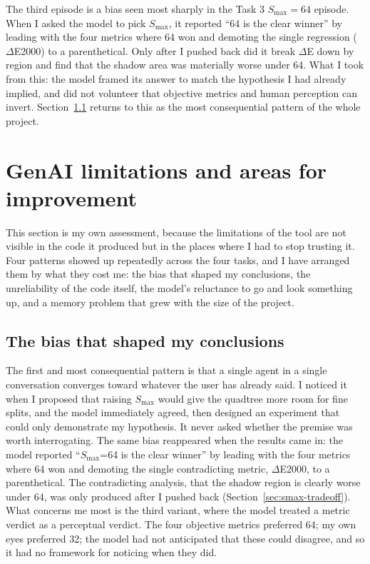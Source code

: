 \documentclass[11pt,a4paper]{article}
\begin{document}
The third episode is a bias seen most sharply in the Task 3 $S_{\max}=64$
episode. When I asked the model to pick $S_{\max}$, it reported ``64 is the clear
winner'' by leading with the four metrics where 64 won and demoting the single
regression ($\Delta$E2000) to a parenthetical. Only after I pushed back did it
break $\Delta$E down by region and find that the shadow area was materially worse
under 64. What I took from this: the model framed its answer to match the
hypothesis I had already implied, and did not volunteer that objective metrics
and human perception can invert. Section~\ref{sec:ai-bias} returns to this as the
most consequential pattern of the whole project.

\FloatBarrier
\FloatBarrier
\section{GenAI limitations and areas for improvement}
\label{sec:ai-limitations}

This section is my own assessment, because the limitations of the tool are not
visible in the code it produced but in the places where I had to stop trusting
it. Four patterns showed up repeatedly across the four tasks, and I have
arranged them by what they cost me: the bias that shaped my conclusions, the
unreliability of the code itself, the model's reluctance to go and look something
up, and a memory problem that grew with the size of the project.

\FloatBarrier
\FloatBarrier
\subsection{The bias that shaped my conclusions}
\label{sec:ai-bias}

The first and most consequential pattern is that a single agent in a single
conversation converges toward whatever the user has already said. I noticed it
when I proposed that raising $S_{\max}$ would give the quadtree more room for
fine splits, and the model immediately agreed, then designed an experiment that
could only demonstrate my hypothesis. It never asked whether the premise was worth
interrogating. The same bias reappeared when the results came in: the model
reported ``$S_{\max}$=64 is the clear winner'' by leading with the four metrics
where 64 won and demoting the single contradicting metric, $\Delta$E2000, to a
parenthetical. The contradicting analysis, that the shadow region is clearly
worse under 64, was only produced after I pushed back
(Section~\ref{sec:smax-tradeoff}). What concerns me most is the third variant,
where the model treated a metric verdict as a perceptual verdict. The four
objective metrics preferred 64; my own eyes preferred 32; the model had not
anticipated that these could disagree, and so it had no framework for noticing
when they did.
\end{document}
